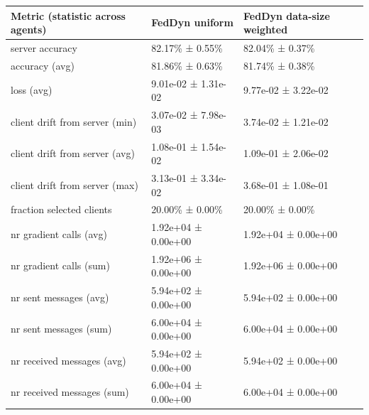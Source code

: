 \begin{tabular}{lll}
\hline
 Metric (statistic across agents)   & FedDyn uniform      & FedDyn data-size weighted   \\
\hline
 server accuracy                    & 82.17\% ± 0.55\%      & 82.04\% ± 0.37\%              \\
 accuracy (avg)                     & 81.86\% ± 0.63\%      & 81.74\% ± 0.38\%              \\
 loss (avg)                         & 9.01e-02 ± 1.31e-02 & 9.77e-02 ± 3.22e-02         \\
 client drift from server (min)     & 3.07e-02 ± 7.98e-03 & 3.74e-02 ± 1.21e-02         \\
 client drift from server (avg)     & 1.08e-01 ± 1.54e-02 & 1.09e-01 ± 2.06e-02         \\
 client drift from server (max)     & 3.13e-01 ± 3.34e-02 & 3.68e-01 ± 1.08e-01         \\
 fraction selected clients          & 20.00\% ± 0.00\%      & 20.00\% ± 0.00\%              \\
 nr gradient calls (avg)            & 1.92e+04 ± 0.00e+00 & 1.92e+04 ± 0.00e+00         \\
 nr gradient calls (sum)            & 1.92e+06 ± 0.00e+00 & 1.92e+06 ± 0.00e+00         \\
 nr sent messages (avg)             & 5.94e+02 ± 0.00e+00 & 5.94e+02 ± 0.00e+00         \\
 nr sent messages (sum)             & 6.00e+04 ± 0.00e+00 & 6.00e+04 ± 0.00e+00         \\
 nr received messages (avg)         & 5.94e+02 ± 0.00e+00 & 5.94e+02 ± 0.00e+00         \\
 nr received messages (sum)         & 6.00e+04 ± 0.00e+00 & 6.00e+04 ± 0.00e+00         \\
\hline
\end{tabular}